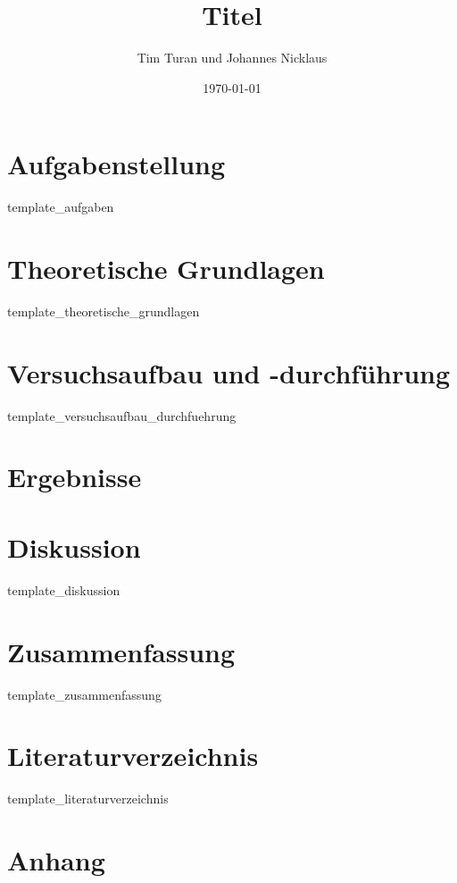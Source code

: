 \documentclass[11pt]{article}
\title{Titel}
\author{Tim Turan und Johannes Nicklaus}
\date{\today}
\begin{document}
\maketitle
\tableofcontents

\section{Aufgabenstellung}
{template_aufgaben}

\section{Theoretische Grundlagen}
{template_theoretische_grundlagen}

\FloatBarrier
\section{Versuchsaufbau und -durchführung }
{template_versuchsaufbau_durchfuehrung}

\FloatBarrier
\section{Ergebnisse}

\FloatBarrier
\section{Diskussion}
{template_diskussion}

\FloatBarrier
\section{Zusammenfassung}
{template_zusammenfassung}

\FloatBarrier
\section{Literaturverzeichnis}
{template_literaturverzeichnis}

\section{Anhang}
\end{document}
